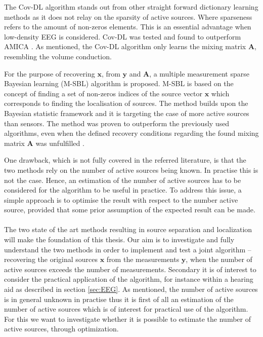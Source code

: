 The Cov-DL algorithm stands out from other straight forward dictionary learning methods as it does not relay on the sparsity of active sources. Where sparseness refers to the amount of non-zeros elements. This is an essential advantage when low-density EEG is considered. 
Cov-DL was tested and found to outperform AMICA \cite{Balkan2015}.  
As mentioned, the Cov-DL algorithm only learns the mixing matrix $\mathbf{A}$, resembling the volume conduction.

For the purpose of recovering $\mathbf{x}$, from $\mathbf{y}$ and $\mathbf{A}$, a multiple measurement sparse Bayesian learning (M-SBL) algorithm is proposed. M-SBL is based on the concept of finding a set of non-zeros indices of the source vector $\mathbf{x}$ which corresponds to finding the localisation of sources. The method builds upon the Bayesian statistic framework and it is targeting the case of more active sources than sensors.
The method was proven to outperform the previously used algorithms, even when the defined recovery conditions regarding the found mixing matrix $\mathbf{A}$ was unfulfilled \cite{Balkan2014}.

One drawback, which is not fully covered in the referred literature, is that the two methods rely on the number of active sources being known. 
In practise this is not the case. 
Hence, an estimation of the number of active sources has to be considered for the algorithm to be useful in practice. To address this issue, a simple approach is to optimise the result with respect to the number active source, provided that some prior assumption of the expected result can be made. 
\\ \\
The two state of the art methods resulting in source separation and localization will make the foundation of this thesis. 
Our aim is to investigate and fully understand the two methods in order to implement and test a joint algorithm -- recovering the original sources $\mathbf{x}$ from the measurements $\mathbf{y}$, when the number of active sources exceeds the number of measurements. 
Secondary it is of interest to consider the practical application of the algorithm, for instance within a hearing aid as described in section \ref{sec:EEG}. 
As mentioned, the number of active sources is in general unknown in practise thus it is first of all an estimation of the number of active sources which is of interest for practical use of the algorithm. 
For this we want to investigate whether it is possible to estimate the number of active sources, through optimization. 

